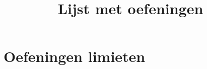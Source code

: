 \documentclass[handout]{xourse}
\title{Lijst met oefeningen}
\begin{document}
\part{Oefeningen limieten}
\end{document}
